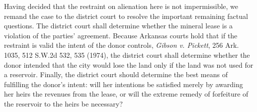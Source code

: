 Having decided that the restraint on alienation here is not impermissible, we
remand the case to the district court to resolve the important remaining
factual questions. The district court shall determine whether the mineral lease
is a violation of the parties' agreement. Because Arkansas courts hold that if
the restraint is valid the intent of the donor controls, \textit{Gibson v.
Pickett}, 256 Ark. 1035, 512 S.W.2d 532, 535 (1974), the district court shall
determine whether the donor intended that the city would lose the land only if
the land was not used for a reservoir. Finally, the district court should
determine the best means of fulfilling the donor's intent: will her intentions
be satisfied merely by awarding her heirs the revenues from the lease, or will
the extreme remedy of forfeiture of the reservoir to the heirs be necessary?


